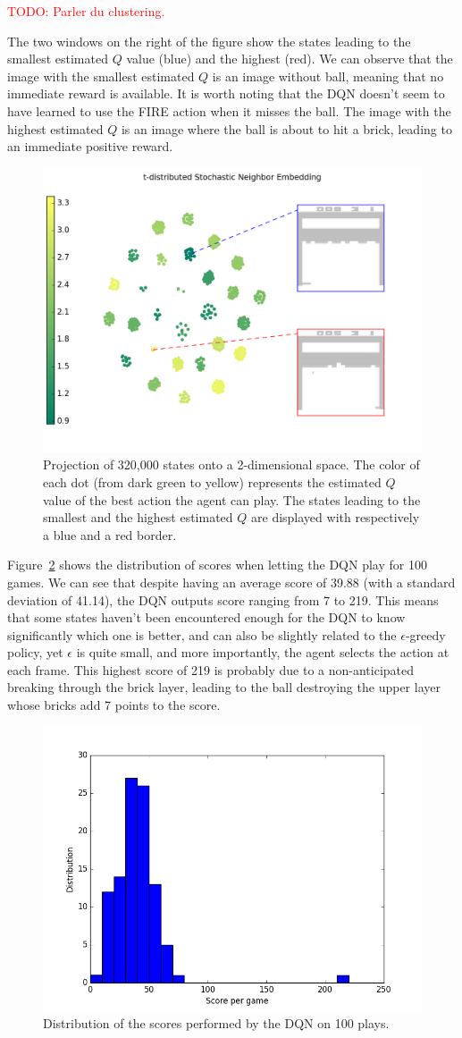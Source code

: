 \documentclass[letterpaper]{article}
\newcommand\todo[1]{\textcolor{red}{TODO: #1}}
\begin{document}
\todo{Parler du clustering.}

The two windows on the right of the figure show the states leading to the smallest estimated $Q$ value (blue) and the highest (red).
We can observe that the image with the smallest estimated $Q$ is an image without ball, meaning that no immediate reward is available. It
is worth noting that the DQN doesn't seem to have learned to use the FIRE action when it misses the ball. The image with the highest estimated
$Q$ is an image where the ball is about to hit a brick, leading to an immediate positive reward.

\begin{figure}[!h]
	\includegraphics[width=.5\textwidth]{figures/TSNE_dqn_uniform}
	\caption{Projection of 320,000 states onto a 2-dimensional space. The color of each dot (from dark green to yellow) represents the estimated $Q$ value of the
	best action the agent can play. The states leading to the smallest and the highest estimated $Q$ are displayed with respectively a blue and a red border.
	\label{fig:t-SNE DQN uniform}}
\end{figure}

Figure~\ref{fig:dqn uniform scores dist} shows the distribution of scores when letting the DQN play for 100 games. We can see that despite having an
average score of 39.88 (with a standard deviation of 41.14), the DQN outputs score ranging from 7 to 219. This means that some states haven't been encountered
enough for the DQN to know significantly which one is better, and can also be slightly related to the $\epsilon$-greedy policy, yet $\epsilon$ is quite small,
and more importantly, the agent selects the action at each frame. This highest score of 219 is probably due to a non-anticipated breaking through
the brick layer, leading to the ball destroying the upper layer whose bricks add 7 points to the score.

\begin{figure}[!h]
	\includegraphics[width=.5\textwidth]{figures/dqn_uniform_score_distribution}
	\caption{Distribution of the scores performed by the DQN on 100 plays.\label{fig:dqn uniform scores dist}}
\end{figure}
\end{document}
